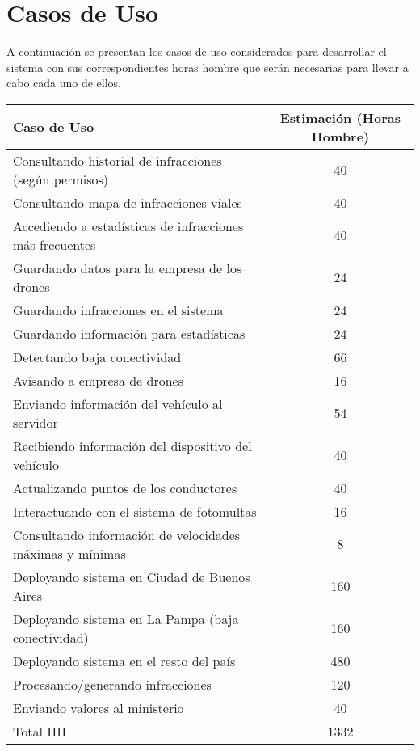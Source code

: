 \section{Casos de Uso}

A continuación se presentan los casos de uso considerados para desarrollar el sistema
con sus correspondientes horas hombre que serán necesarias para llevar a cabo 
cada uno de ellos.


\begin{table}[htb]
\begin{center}
\begin{tabular}{|l|c|}
\hline
Caso de Uso & Estimación (Horas Hombre) \\
\hline \hline
Consultando historial de infracciones (según permisos) & 40 \\ \hline
Consultando mapa de infracciones viales & 40 \\ \hline
Accediendo a estadísticas de infracciones más frecuentes & 40 \\ \hline
Guardando datos para la empresa de los drones & 24 \\ \hline
Guardando infracciones en el sistema & 24 \\ \hline
Guardando información para estadísticas & 24 \\ \hline
Detectando baja conectividad & 66 \\ \hline
Avisando a empresa de drones & 16 \\ \hline
Enviando información del vehículo al servidor & 54 \\ \hline
Recibiendo información del dispositivo del vehículo & 40 \\ \hline
Actualizando puntos de los conductores & 40 \\ \hline
Interactuando con el sistema de fotomultas & 16 \\ \hline
Consultando información de velocidades máximas y mínimas & 8 \\ \hline
Deployando sistema en Ciudad de Buenos Aires & 160 \\ \hline
Deployando sistema en La Pampa (baja conectividad) & 160 \\ \hline
Deployando sistema en el resto del país & 480 \\ \hline
Procesando/generando infracciones & 120 \\ \hline
Enviando valores al ministerio & 40 \\ \hline
Total HH & 1332 \\ \hline
\end{tabular}
\label{tabla:sencilla}
\end{center}
\end{table}

